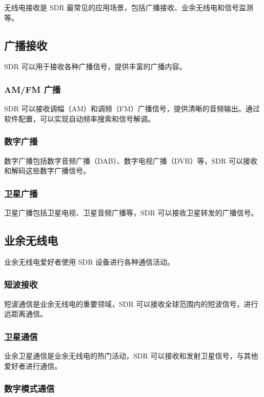 \documentclass[UTF8]{ctexbook}
\begin{document}
无线电接收是 SDR 最常见的应用场景，包括广播接收、业余无线电和信号监测等。

\subsection{广播接收}

SDR 可以用于接收各种广播信号，提供丰富的广播内容。

\subsubsection{AM/FM 广播}

SDR 可以接收调幅（AM）和调频（FM）广播信号，提供清晰的音频输出。通过软件配置，可以实现自动频率搜索和信号解调。

\subsubsection{数字广播}

数字广播包括数字音频广播（DAB）、数字电视广播（DVB）等，SDR 可以接收和解码这些数字广播信号。

\subsubsection{卫星广播}

卫星广播包括卫星电视、卫星音频广播等，SDR 可以接收卫星转发的广播信号。

\subsection{业余无线电}

业余无线电爱好者使用 SDR 设备进行各种通信活动。

\subsubsection{短波接收}

短波通信是业余无线电的重要领域，SDR 可以接收全球范围内的短波信号，进行远距离通信。

\subsubsection{卫星通信}

业余卫星通信是业余无线电的热门活动，SDR 可以接收和发射卫星信号，与其他爱好者进行通信。

\subsubsection{数字模式通信}
\end{document}

